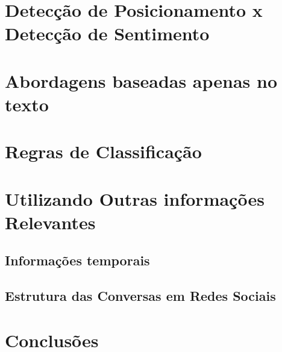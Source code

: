 \section{Detecção de Posicionamento x Detecção de Sentimento}

\section{Abordagens baseadas apenas no texto}

\section{Regras de Classificação}

\section{Utilizando Outras informações Relevantes}

\subsection{Informações temporais}

\subsection{Estrutura das Conversas em Redes Sociais}

\section{Conclusões}
